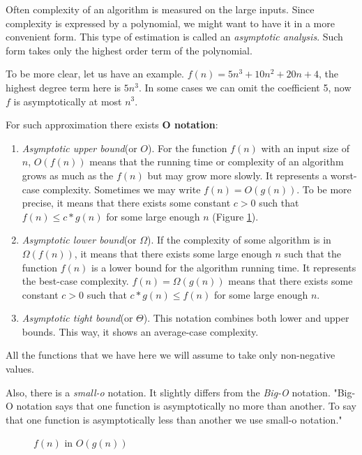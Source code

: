 \documentclass[
  field=inf,
  biblatex,
  language=english,
  glossaries,
  theorems=false,
  sourcecodes=false,
  index
]{kidiplom}
\begin{document}
Often complexity of an algorithm is measured on the large inputs. Since complexity is expressed by a polynomial, we might want to have it in a more convenient form. This type of estimation is called an \textit{asymptotic analysis}. Such form takes only the highest order term of the polynomial.

To be more clear, let us have an example. $f(n) = 5n^3 + 10n^2 + 20n + 4$, the highest degree term here is $5n^3$. In some cases we can omit the coefficient 5, now $f$ is asymptotically at most $n^3$.

For such approximation there exists \textbf{O notation}:

\begin{enumerate}
	\item \textit{Asymptotic upper bound}(or $O$). For the function $f(n)$ with an input size of $n$, $O(f(n))$ means that the running time or complexity of an algorithm grows as much as the $f(n)$ but may grow more slowly. It represents a worst-case complexity. Sometimes we may write $f(n) = O(g(n))$. To be more precise, it means that there exists some constant $c > 0$ such that $f(n) \leq c * g(n)$ for some large enough $n$ (Figure \ref{fig:big-omega}).
	\item \textit{Asymptotic lower bound}(or $\Omega$). If the complexity of some algorithm is in $\Omega(f(n))$, it means that there exists some large enough $n$ such that the function $f(n)$ is a lower bound for the algorithm running time. It represents the best-case complexity. $f(n) = \Omega(g(n))$ means that there exists some constant $c > 0$ such that $c * g(n) \leq f(n)$ for some large enough $n$.
	\item \textit{Asymptotic tight bound}(or $\Theta$). This notation combines both lower and upper bounds. This way, it shows an average-case complexity.
\end{enumerate}

All the functions that we have here we will assume to take only non-negative values.

Also, there is a \textit{small-o} notation. It slightly differs from the \textit{Big-O} notation. "Big-O notation says that one function is asymptotically no more than  another. To say that one  function is asymptotically less than another we use small-o notation."\cite{sipser}

\begin{figure}[H]
	\begin{center}
		\caption{$f(n)$ in $O(g(n))$} \label{fig:big-omega}
	\end{center}
\end{figure}
\end{document}
